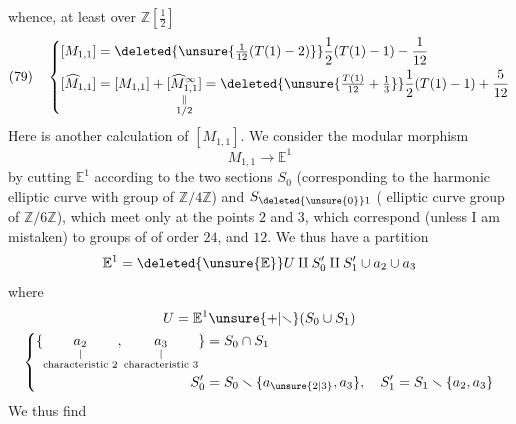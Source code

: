 whence, at least over $\mathbb Z[\frac12]$
\[
(79)\quad\left\{\begin{aligned}
[M_{1,1}]&=\deleted{\unsure{\tfrac1{12}(T(1)-2)}}\frac12(T(1)-1)-\frac1{12}\\
[\widehat M_{1,1}]&=[M_{1,1}]+\underset{\substack{\Vert\\1/2}}{[\widehat M^\infty_{1,1}]}=\deleted{\unsure{\tfrac{T(1)}{12}+\tfrac13}}\frac12(T(1)-1)+\frac5{12}
\end{aligned}\right.
\]
Here is another calculation of $[M_{1,1}]$. We consider the modular morphism
\[
M_{1,1}\longrightarrow\mathbb E^1
\]
 by cutting $\mathbb E^1$ according to the two sections $S_0$ (corresponding to the harmonic elliptic curve with group of  $\mathbb Z/4\mathbb Z$) and $S_{\deleted{\unsure{0}}1}$  ( elliptic curve  group of  $\mathbb Z/6\mathbb Z$), which meet only at the points $2$ and $3$, which correspond (unless I am mistaken) to groups of  of order $24$, and $12$. We thus have a partition
\[
\mathbb E^1=\deleted{\unsure{\mathbb E}}U\amalg S'_0\amalg S'_1\cup a_2\cup a_3
\]
where 
\[
\begin{gathered}
U=\mathbb E^1\unsure{+|\smallsetminus}(S_0\cup S_1)\\
\left\{\begin{aligned}
\{\underset{\substack{|\\\text{characteristic }2}}{a_2},\underset{\substack{|\\\text{characteristic }3}}{a_3}\}&=S_0\cap S_1\\
S'_0&=S_0\smallsetminus\{a_{\unsure{2|3}},a_3\},\quad S'_1=S_1\smallsetminus\{a_2,a_3\}
\end{aligned}\right.
\end{gathered}
\]
We thus find
